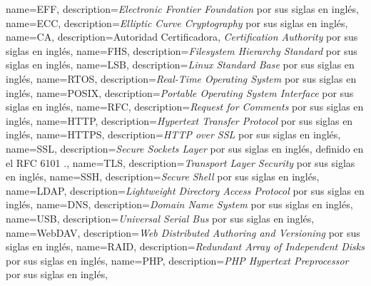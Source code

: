 {
  name=EFF,
  description={\emph{Electronic Frontier Foundation} por sus siglas en ingl\'{e}s},
}
{
  name=ECC,
  description={\emph{Elliptic Curve Cryptography} por sus siglas en ingl\'{e}s},
}
{
  name={CA},
  description={Autoridad Certificadora, \textit{Certification Authority} por sus siglas en ingl\'{e}s},
}
{
  name={FHS},
  description={\textit{Filesystem Hierarchy Standard} por sus siglas en ingl\'{e}s},
}
{
  name={LSB},
  description={\textit{Linux Standard Base} por sus siglas en ingl\'{e}s},
}
{
  name={RTOS},
  description={\textit{Real-Time Operating System} por sus siglas en ingl\'{e}s},
}
{
  name={POSIX},
  description={\textit{Portable Operating System Interface} por sus siglas en ingl\'{e}s},
}
{
  name={RFC},
  description={\textit{Request for Comments} por sus siglas en ingl\'{e}s},
}
{
  name={HTTP},
  description={\textit{Hypertext Transfer Protocol} por sus siglas en ingl\'{e}s},
}
{
  name={HTTPS},
  description={\textit{HTTP over SSL} por sus siglas en ingl\'{e}s},
}
{
  name={SSL},
  description={\textit{Secure Sockets Layer} por sus siglas en ingl\'{e}s, definido en el \textsc{RFC} 6101 \cite{_rfc_????-4}.},
}
{
  name={TLS},
  description={\textit{Transport Layer Security} por sus siglas en ingl\'{e}s},
}
{
  name={SSH},
  description={\textit{Secure Shell} por sus siglas en ingl\'{e}s},
}
{
  name={LDAP},
  description={\textit{Lightweight Directory Access Protocol} por sus siglas en ingl\'{e}s},
}
{
  name={DNS},
  description={\textit{Domain Name System} por sus siglas en ingl\'{e}s},
}
{
  name={USB},
  description={\textit{Universal Serial Bus} por sus siglas en ingl\'{e}s},
}
{
  name={WebDAV},
  description={\textit{Web Distributed Authoring and Versioning} por sus siglas en ingl\'{e}s},
}
{
  name={RAID},
  description={\textit{Redundant Array of Independent Disks} por sus siglas en ingl\'{e}s},
}
{
  name={PHP},
  description={\textit{PHP Hypertext Preprocessor} por sus siglas en ingl\'{e}s},
}
